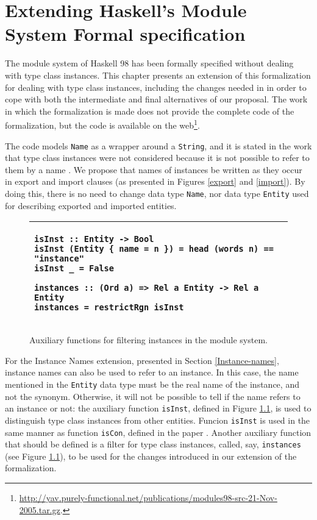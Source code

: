 \documentclass[msc]{ppgccufmg}
\begin{document}
\chapter[Extending the Module System specification]{Extending Haskell's Module System Formal specification}
The module system of Haskell 98 has been formally specified
\citep{formal} without dealing with type class instances. This chapter
presents an extension of this formalization for dealing with type
class instances, including the changes needed in \citep{formal} in
order to cope with both the intermediate and final alternatives of our
proposal.  The work in which the formalization is made does not
provide the complete code of the formalization, but the code is
available on the
web\footnote{\url{http://yav.purely-functional.net/publications/modules98-src-21-Nov-2005.tar.gz}.}.

The code models \texttt{Name} as a wrapper around a \texttt{String},
and it is stated in the work that type class instances were not
considered because it is not possible to refer to them by a
name \citep[section~3.1]{formal}. We propose that names of instances be
written as they occur in export and import clauses (as presented in
Figures \ref{export} and \ref{import}).  By doing this, there is no
need to change data type \texttt{Name}, nor data type \texttt{Entity}
used for describing exported and imported entities.

\begin{figure}
\caption{Auxiliary functions for filtering instances in the module
  system.\label{new}}
\begin{tabular}{|p{\textwidth}|}
\hline
\begin{verbatim}
isInst :: Entity -> Bool
isInst (Entity { name = n }) = head (words n) == "instance"
isInst _ = False

instances :: (Ord a) => Rel a Entity -> Rel a Entity
instances = restrictRgn isInst
\end{verbatim}
\\
\hline
\end{tabular}
\end{figure}

For the Instance Names extension, presented in Section
\ref{Instance-names}, instance names can also be used to refer to an
instance. In this case, the name mentioned in the \texttt{Entity} data
type must be the real name of the instance, and not the synonym.
Otherwise, it will not be possible to tell if the name refers to an
instance or not: the auxiliary function \texttt{isInst}, defined in
Figure \ref{new}, is used to distinguish type class instances from
other entities. Funcion \texttt{isInst} is used in the same manner as
function \texttt{isCon}, defined in the paper \citep[section
  3.1]{formal}. Another auxiliary function that should be defined is a
filter for type class instances, called, say, \texttt{instances} (see
Figure \ref{new}), to be used for the changes introduced in our
extension of the formalization. 
\end{document}
